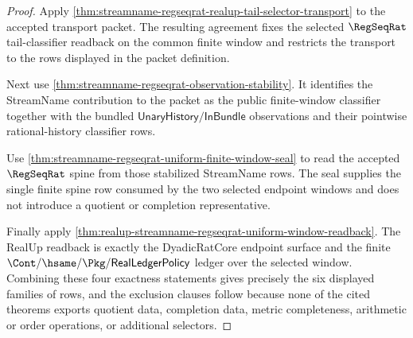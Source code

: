 \begin{proof}
Apply
\autoref{thm:streamname-regseqrat-realup-tail-selector-transport} to the accepted
transport packet. The resulting agreement fixes the selected $\RegSeqRat$
tail-classifier readback on the common finite window and restricts the
transport to the rows displayed in the packet definition.

Next use \autoref{thm:streamname-regseqrat-observation-stability}. It identifies
the StreamName contribution to the packet as the public finite-window classifier
together with the bundled $\mathsf{UnaryHistory}/\mathsf{InBundle}$ observations
and their pointwise rational-history classifier rows.

Use \autoref{thm:streamname-regseqrat-uniform-finite-window-seal} to read the
accepted $\RegSeqRat$ spine from those stabilized StreamName rows. The seal
supplies the single finite spine row consumed by the two selected endpoint
windows and does not introduce a quotient or completion representative.

Finally apply
\autoref{thm:realup-streamname-regseqrat-uniform-window-readback}. The RealUp
readback is exactly the DyadicRatCore endpoint surface and the finite
$\Cont/\hsame/\Pkg/\mathsf{RealLedgerPolicy}$ ledger over the selected window.
Combining these four exactness statements gives precisely the six displayed
families of rows, and the exclusion clauses follow because none of the cited
theorems exports quotient data, completion data, metric completeness,
arithmetic or order operations, or additional selectors.
\end{proof}

